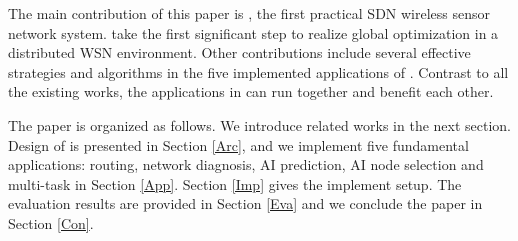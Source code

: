 The main contribution of this paper is {\sdn}, the first 
practical SDN wireless sensor network system. 
{\sdn} take the first significant step to realize global optimization in a distributed WSN environment.
Other contributions include several effective strategies and algorithms 
in the five implemented applications of {\sdn}. 
Contrast to all the existing works, the applications in {\sdn}
can run together and benefit each other. 



The paper is organized as follows. We introduce related works in the next section. 
Design of {\sdn} is presented in Section \ref{Arc}, 
and we implement five fundamental applications: routing, network diagnosis, 
AI prediction, AI node selection and multi-task in Section \ref{App}. 
Section \ref{Imp} gives the implement setup.
The evaluation results are provided in Section \ref{Eva} 
and we conclude the paper in Section \ref{Con}.

